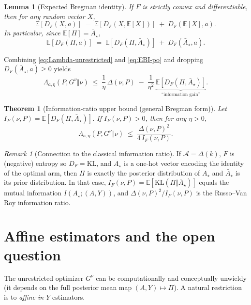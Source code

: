 \documentclass[11pt]{article}
\newcommand{\E}{\mathbb{E}}
\newcommand{\cA}{\mathcal{A}}
\newcommand{\pr}{\bar A_\star}   %
\newcommand{\po}{\Pi}           %
\theoremstyle{definition}
\theoremstyle{plain}
\newtheorem{lemma}{Lemma}
\newtheorem{theorem}{Theorem}
\theoremstyle{remark}
\newtheorem{remark}{Remark}
\begin{document}
\begin{lemma}[Expected Bregman identity]
    \label{lem:EBI}
    If $F$ is strictly convex and differentiable, then for any random vector $X$,
    \[
        \E[D_F(X,a)]
        \;=\;
        \E[D_F(X,\E[X])]
        \;+\;
        D_F(\E[X],a).
    \]
    In particular, since $\E[\po]=\pr$,
    \begin{equation}
        \label{eq:EBI-po}
        \E[D_F(\po,a)]
        \;=\;
        \E[D_F(\po,\pr)]
        \;+\;
        D_F(\pr,a).
    \end{equation}
\end{lemma}

Combining \eqref{eq:Lambda-unrestricted} and \eqref{eq:EBI-po} and dropping $D_F(\pr,a)\ge 0$ yields
\begin{equation}
    \label{eq:Lambda-unrestricted-drop}
    \Lambda_{a,\eta}(P,G^\nu \Vert \nu)
    \;\le\;
    \frac{1}{\eta}\,\Delta(\nu,P)
    \;-\;
    \frac{1}{\eta^2}\,\underbrace{\E[D_F(\po,\pr)]}_{\text{``information gain''}}.
\end{equation}

\begin{theorem}[Information-ratio upper bound (general Bregman form)]
    \label{thm:info-ratio}
    Let $I_F(\nu,P)=\E[D_F(\po,\pr)]$. If $I_F(\nu,P)>0$, then for any $\eta>0$,
    \[
        \Lambda_{a,\eta}(P,G^\nu \Vert \nu)
        \;\le\;
        \frac{\Delta(\nu,P)^2}{4\,I_F(\nu,P)}.
    \]
\end{theorem}

\begin{remark}[Connection to the classical information ratio]
    If $\cA=\Delta(k)$, $F$ is (negative) entropy so $D_F=\mathrm{KL}$, and $A_\star$ is a one-hot vector encoding the identity of the optimal arm,
    then $\po$ is exactly the posterior distribution of $A_\star$ and $\pr$ is its prior distribution. In that case,
    $I_F(\nu,P)=\E[\mathrm{KL}(\po\Vert \pr)]$ equals the mutual information $I(A_\star;(A,Y))$,
    and $\Delta(\nu,P)^2/I_F(\nu,P)$ is the Russo--Van Roy information ratio.
\end{remark}

\section{Affine estimators and the open question}

The unrestricted optimizer $G^\nu$ can be computationally and conceptually unwieldy (it depends on the full posterior mean map $(A,Y)\mapsto \po$).
A natural restriction is to \emph{affine-in-$Y$} estimators.
\end{document}
